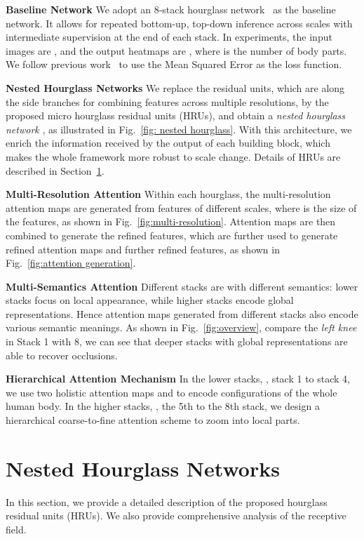\documentclass[10pt,twocolumn,letterpaper]{article}
\newcommand{\smalltitle}[1]{\vspace{0.2em}\noindent \textbf{{#1}}}
\begin{document}
\smalltitle{Baseline Network} 
We adopt an 8-stack hourglass network~\cite{newell2016stacked} as the baseline network. 
It allows for repeated bottom-up, top-down inference across scales with intermediate supervision at the end of each stack.  
In experiments, the input images are , and the output heatmaps are , where  is the number of body parts. 
We follow previous work~\cite{tompson2015efficient,wei2016convolutional,newell2016stacked} to use the Mean Squared Error as the loss function. 

\smalltitle{Nested Hourglass Networks} 
We replace the residual units, which are along the side branches for combining features across multiple resolutions, 
by the proposed micro hourglass residual units (HRUs), and obtain a \textit{nested hourglass network}
, as illustrated in Fig.~\ref{fig: nested hourglass}. 
With this architecture, we enrich the information received by the output of each building block, which makes the whole framework more robust to scale change. 
Details of HRUs are described in Section~\ref{sec: Nested Hourglass unit}.

\smalltitle{Multi-Resolution Attention} 
Within each hourglass, the multi-resolution attention maps  are generated from features of different scales, where  is the size of the features, as shown in Fig.~\ref{fig:multi-resolution}.
Attention maps are then combined to generate the refined features, which are further used to generate refined attention maps and further refined features, as shown in Fig.~\ref{fig:attention generation}.


\smalltitle{Multi-Semantics Attention}
Different stacks are with different semantics: lower stacks focus on local appearance, while higher stacks encode global representations.
Hence attention maps generated from different stacks also encode various semantic meanings. 
As shown in Fig.~\ref{fig:overview}, compare the \textit{left knee} in Stack 1 with 8, we can see that deeper stacks with global representations are able to recover occlusions.

\smalltitle{Hierarchical Attention Mechanism} 
In the lower stacks, \ie, stack 1 to stack 4, we use two holistic attention maps  and  to encode configurations of the whole human body. 
In the higher stacks, \ie, the 5th to the 8th stack, we design a hierarchical coarse-to-fine attention scheme to zoom into local parts. 


\vspace{-1em}
\section{Nested Hourglass Networks}\label{sec: Nested Hourglass unit}
In this section, we provide a detailed description of the proposed hourglass residual units (HRUs). We also provide comprehensive analysis of the receptive field.
\end{document}
